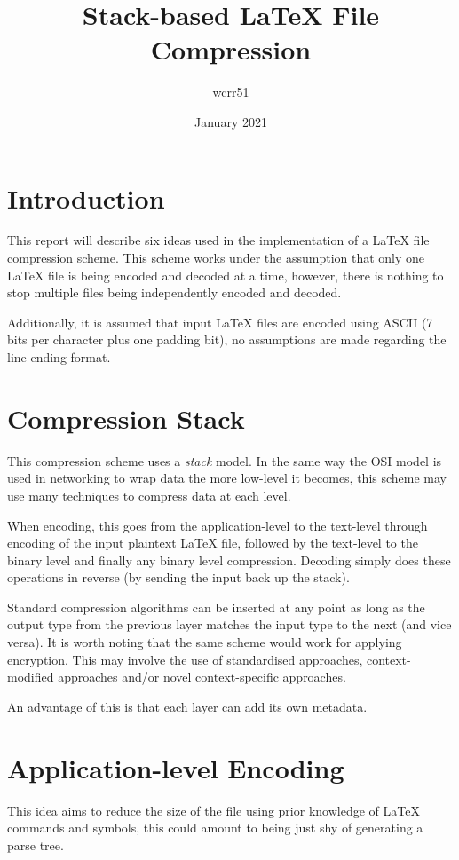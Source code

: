\documentclass[11pt]{article}
\title{Stack-based \LaTeX{} File Compression}
\author{wcrr51}
\date{January 2021}
\begin{document}
    \maketitle

    \section{Introduction}\label{sec:introduction}
    This report will describe six ideas used in the implementation of a \LaTeX{} file compression scheme.
    This scheme works under the assumption that only one \LaTeX{} file is being encoded and decoded at a time, however, there is nothing to stop multiple files being independently encoded and decoded.

    Additionally, it is assumed that input \LaTeX{} files are encoded using ASCII (7 bits per character plus one padding bit), no assumptions are made regarding the line ending format.


    \section{Compression Stack}\label{sec:compression-stack}
    This compression scheme uses a \textit{stack} model.
    In the same way the OSI model is used in networking to wrap data the more low-level it becomes, this scheme may use many techniques to compress data at each level.

    When encoding, this goes from the application-level to the text-level through encoding of the input plaintext \LaTeX{} file, followed by the text-level to the binary level and finally any binary level compression.
    Decoding simply does these operations in reverse (by sending the input back up the stack).

    Standard compression algorithms can be inserted at any point as long as the output type from the previous layer matches the input type to the next (and vice versa).
    It is worth noting that the same scheme would work for applying encryption.
    This may involve the use of standardised approaches, context-modified approaches and/or novel context-specific approaches.

    An advantage of this is that each layer can add its own metadata.


    \section{Application-level Encoding}\label{sec:application-level-encoding}
    This idea aims to reduce the size of the file using prior knowledge of \LaTeX{} commands and symbols, this could amount to being just shy of generating a parse tree.
\end{document}
